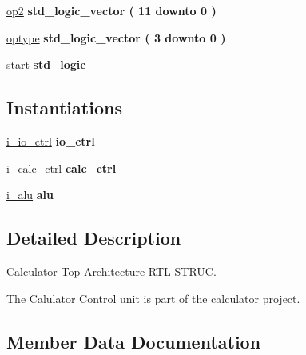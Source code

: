 \begin{DoxyCompactItemize}
\item 
\hyperlink{classcalc__top_1_1struc_afa4ad824eaff926700879a3fdd833ba6}{op2} {\bfseries \textcolor{comment}{std\+\_\+logic\+\_\+vector}\textcolor{vhdlchar}{ }\textcolor{vhdlchar}{(}\textcolor{vhdlchar}{ }\textcolor{vhdlchar}{ } \textcolor{vhdldigit}{11} \textcolor{vhdlchar}{ }\textcolor{keywordflow}{downto}\textcolor{vhdlchar}{ }\textcolor{vhdlchar}{ } \textcolor{vhdldigit}{0} \textcolor{vhdlchar}{ }\textcolor{vhdlchar}{)}\textcolor{vhdlchar}{ }} 
\item 
\hyperlink{classcalc__top_1_1struc_a2f65b6e4bcacc95242acc42352c527d6}{optype} {\bfseries \textcolor{comment}{std\+\_\+logic\+\_\+vector}\textcolor{vhdlchar}{ }\textcolor{vhdlchar}{(}\textcolor{vhdlchar}{ }\textcolor{vhdlchar}{ } \textcolor{vhdldigit}{3} \textcolor{vhdlchar}{ }\textcolor{keywordflow}{downto}\textcolor{vhdlchar}{ }\textcolor{vhdlchar}{ } \textcolor{vhdldigit}{0} \textcolor{vhdlchar}{ }\textcolor{vhdlchar}{)}\textcolor{vhdlchar}{ }} 
\item 
\hyperlink{classcalc__top_1_1struc_a3ab2830fffba8e617a73f33778a4d1de}{start} {\bfseries \textcolor{comment}{std\+\_\+logic}\textcolor{vhdlchar}{ }} 
\end{DoxyCompactItemize}
\subsection*{Instantiations}
 \begin{DoxyCompactItemize}
\item 
\hyperlink{classcalc__top_1_1struc_a27c0b00ffb215dedd3c56546e08ebc31}{i\+\_\+io\+\_\+ctrl}  {\bfseries io\+\_\+ctrl}   
\item 
\hyperlink{classcalc__top_1_1struc_af496ee9657b7be2d83caead5654a279c}{i\+\_\+calc\+\_\+ctrl}  {\bfseries calc\+\_\+ctrl}   
\item 
\hyperlink{classcalc__top_1_1struc_a9782fd33327dd4a14d723cbf74b8cea0}{i\+\_\+alu}  {\bfseries alu}   
\end{DoxyCompactItemize}


\subsection{Detailed Description}
Calculator Top Architecture R\+T\+L-\/\+S\+T\+R\+UC. 

The Calulator Control unit is part of the calculator project. 

\subsection{Member Data Documentation}
\mbox{\label{classcalc__top_1_1struc_a205ce47b385f0dede25ae06417988605}} 
